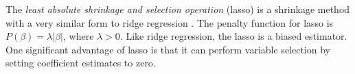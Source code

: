 \documentclass{article}
\begin{document}

	
	The \textit{least absolute shrinkage and selection operation} (lasso) is a shrinkage method with a very similar form to ridge regression \cite{tibshirani1996regression, james2013introduction}. The penalty function for lasso is $P(\beta) = \lambda\vert \beta \vert$, where $\lambda > 0$. Like ridge regression, the lasso is a biased estimator. One significant advantage of lasso is that it can perform variable selection by setting coefficient estimates to zero.
	

	
\end{document}
